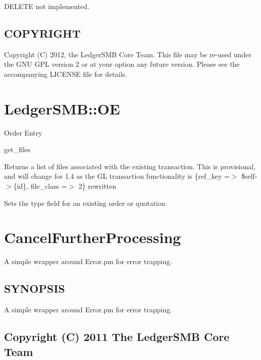 \begin{description}
\begin{description}
\begin{description}
\begin{description}
\begin{description}
\begin{description}
\begin{description}
\item[{DELETE not implemented.}] \mbox{}\end{description}
\subsection*{COPYRIGHT\label{LedgerSMB::REST_Class::Contact_COPYRIGHT}}


Copyright (C) 2012, the LedgerSMB Core Team.  This file may be re-used under 
the GNU GPL version 2 or at your option any future version.  Please see the 
accompanying LICENSE file for details.

\section{LedgerSMB::OE\label{LedgerSMB::OE}}


Order Entry

get\_files



Returns a list of files associated with the existing transaction.  This is 
provisional, and will change for 1.4 as the GL transaction functionality is 
                  \{ref\_key =$>$ \$self-$>$\{id\}, file\_class =$>$ 2\}
rewritten



Sets the type field for an existing order or quotation

\section{CancelFurtherProcessing\label{CancelFurtherProcessing}}


A simple wrapper around Error.pm for error trapping.

\subsection*{SYNOPSIS\label{CancelFurtherProcessing_SYNOPSIS}}


A simple wrapper around Error.pm for error trapping.

\subsection*{Copyright (C) 2011 The LedgerSMB Core Team\label{CancelFurtherProcessing_Copyright_C_2011_The_LedgerSMB_Core_Team}}



\end{description}
\end{description}
\end{description}
\end{description}
\end{description}
\end{description}
